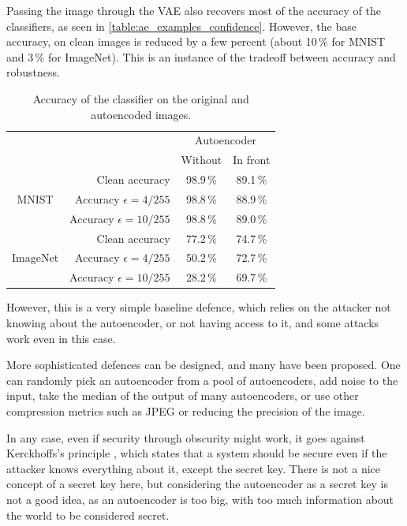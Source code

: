 \documentclass[]{scrarticle}
\renewcommand{\todo}[1]{}
\begin{document}
Passing the image through the VAE also recovers most of the accuracy
of the classifiers, as seen in \autoref{table:ae_examples_confidence}.
However, the base accuracy, on clean images is reduced by a few percent
(about 10\,\% for MNIST and 3\,\% for ImageNet).
This is an instance of the tradeoff between accuracy and robustness.

\begin{table}[h]
  \centering

    \begin{tabular}{c|r|cc}
    & & \multicolumn{2}{c}{Autoencoder} \\
    & & Without & In front \\
    \hline
    \multirow{3}{*}{MNIST}
    &  Clean accuracy			& 98.9\,\%	& 89.1\,\%	\\
    &  Accuracy $\epsilon=4/255$	& 98.8\,\%	& 88.9\,\%	\\
    &  Accuracy $\epsilon=10/255$	& 98.8\,\%	& 89.0\,\%	\\
    \hline
    \multirow{3}{*}{ImageNet}
    &  Clean accuracy			& 77.2\,\%	& 74.7\,\%	\\
    &  Accuracy $\epsilon=4/255$	& 50.2\,\%	& 72.7\,\%	\\
    &  Accuracy $\epsilon=10/255$	& 28.2\,\%	& 69.7\,\%	\\
  \end{tabular}

  \caption{Accuracy of the classifier on the original and autoencoded images.}
  \label{table:ae_examples_confidence}
\end{table}

However, this is a very simple baseline defence, which relies on the attacker
not knowing about the autoencoder, or not having access to it,
and some attacks work even in this case.
\todo{Add reference to the paper that does this}

More sophisticated defences can be designed, and many have been proposed.
One can randomly pick an autoencoder from a pool of autoencoders,
add noise to the input, take the median of the output of many autoencoders,
or use other compression metrics such as JPEG \cite{Shin2017JPEGresistantAI}
or reducing the precision of the image.
\todo{Add reference to the paper that does this}

In any case, even if security through obscurity might work,
it goes against Kerckhoffs's principle \cite{kerckhoffs1883cryptographie},
which states that a system should be secure even if the attacker
knows everything about it, except the secret key.
There is not a nice concept of a secret key here,
but considering the autoencoder as a secret key is not a good idea,
as an autoencoder is too big, with too much information about the world
to be considered secret.
\end{document}

